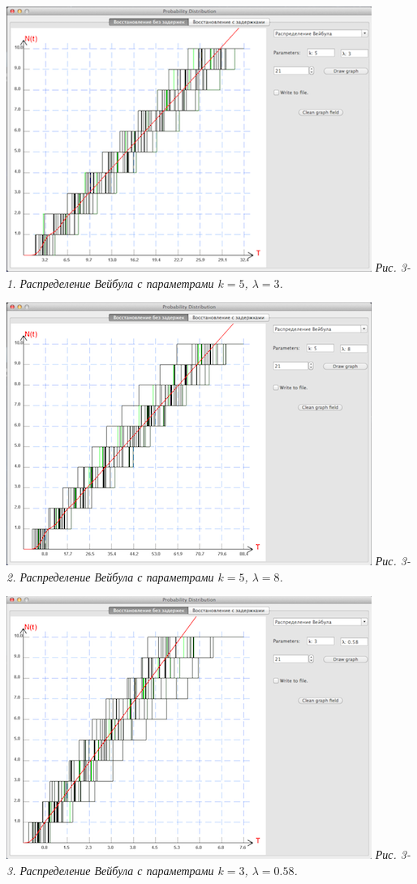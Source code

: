 \includegraphics{3-1.png} 
\textit{Рис. 3-1. Распределение Вейбула с параметрами $k = 5$, $\lambda = 3$.}

\includegraphics{3-2.png} 
\textit{Рис. 3-2. Распределение Вейбула с параметрами $k = 5$, $\lambda = 8$.}

\includegraphics{3-3.png} 
\textit{Рис. 3-3. Распределение Вейбула с параметрами $k = 3$, $\lambda = 0.58$.}

